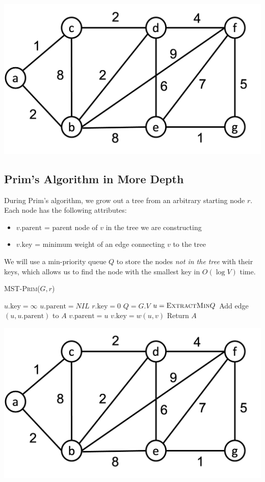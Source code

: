 \documentclass[11  pt]{exam}
\begin{document}
\vs{1cm}

\begin{center}
	\includegraphics[width = .75\linewidth]{mst-graph.png}
\end{center}

\newpage
\subsection{Prim's Algorithm in More Depth}

During Prim's algorithm, we grow out a tree from an arbitrary starting node $r$. Each node has the following attributes:
\begin{itemize}
	\item $v.\text{parent}$ = parent node of $v$ in the tree we are constructing
	\item $v.\text{key}$ = minimum weight of an edge connecting $v$ to the tree
\end{itemize}
We will use a min-priority queue $Q$ to store the nodes \emph{not in the tree} with their keys, which allows us to find the node with the smallest key in $O(\log V)$ time. 

\begin{algorithm}
	\textsc{MST-Prim}($G,r$)
	\begin{algorithmic}
		\State $u.\text{key} = \infty$
		\State $u.\text{parent} = NIL$
		\EndFor
		\State $r.\text{key} = 0$
		\State $Q = G.V$ 
		\State $u = \textsc{ExtractMin}{Q}$
		\State Add edge $(u,u.\text{parent})$ to $A$
		\EndIf
		\State $v.\text{parent} = u$
		\State $v.\text{key} = w(u,v)$
		\EndIf
		\EndFor
		\EndWhile
		\State Return $A$
	\end{algorithmic}
\end{algorithm}

\begin{center}
	\includegraphics[width = .75\linewidth]{mst-graph.png}
\end{center}
\end{document}

